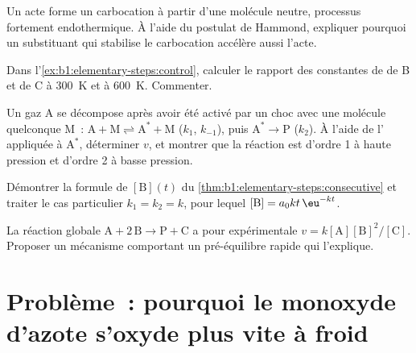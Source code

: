 \begin{exercise}[$\star\star$]\label{exo:b1:elementary-steps:8}
Un acte forme un carbocation à partir d'une molécule neutre, processus
fortement endothermique. À l'aide du postulat de Hammond, expliquer
pourquoi un substituant qui stabilise le carbocation accélère aussi
l'acte.
\end{exercise}

\begin{exercise}[$\star\star$]\label{exo:b1:elementary-steps:9}
Dans l'\cref{ex:b1:elementary-steps:control}, calculer le rapport des
constantes de  de B et de C à \qty{300}{K} et à
\qty{600}{K}. Commenter.
\end{exercise}

\begin{exercise}[$\star\star\star$]\label{exo:b1:elementary-steps:10}
Un gaz $\mathrm{A}$ se décompose après avoir été activé par un choc avec
une molécule quelconque $\mathrm{M}$~: $\mathrm{A} + \mathrm{M} \rightleftharpoons
\mathrm{A}^* + \mathrm{M}$ ($k_1$, $k_{-1}$), puis $\mathrm{A}^* \to
\mathrm{P}$ ($k_2$). À l'aide de l' appliquée à
$\mathrm{A}^*$, déterminer $v$, et montrer que la réaction est d'ordre 1
à haute pression et d'ordre 2 à basse pression.
\end{exercise}

\begin{exercise}[$\star\star\star$]\label{exo:b1:elementary-steps:11}
Démontrer la formule de $[\mathrm{B}](t)$ du
\cref{thm:b1:elementary-steps:consecutive} et traiter le cas particulier
$k_1 = k_2 = k$, pour lequel $[\mathrm{B}] = a_0kt\,\eu^{-kt}$.
\end{exercise}

\begin{exercise}[$\star\star\star$]\label{exo:b1:elementary-steps:12}
La réaction globale $\mathrm{A} + 2\,\mathrm{B} \to \mathrm{P} +
\mathrm{C}$ a pour  expérimentale $v =
k[\mathrm{A}][\mathrm{B}]^2/[\mathrm{C}]$. Proposer un mécanisme
comportant un pré-équilibre rapide qui l'explique.
\end{exercise}

\section{Problème~: pourquoi le monoxyde d'azote s'oxyde plus vite à froid}


